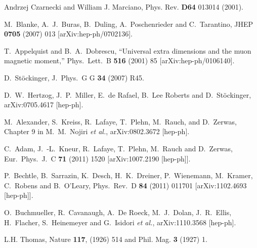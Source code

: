 \begin{thebibliography}{99}
  Andrzej Czarnecki and William J. Marciano,
Phys. Rev. {\bf D64} 013014 (2001).

  M.~Blanke, A.~J.~Buras, B.~Duling, A.~Poschenrieder and C.~Tarantino,
  JHEP {\bf 0705} (2007) 013
  [arXiv:hep-ph/0702136].

 T.~Appelquist and B.~A.~Dobrescu, ``Universal extra
dimensions and the muon magnetic moment,'' Phys.\ Lett.\ B
\textbf{516}
(2001) 85 [arXiv:hep-ph/0106140]. %

 D.\ St\"ockinger,
  J.\ Phys.\ G G {\bf 34} (2007) R45.

 D.~W.~Hertzog, J.~P.~Miller, E.~de Rafael, B.~Lee
Roberts and D.~St\"ockinger,
arXiv:0705.4617 [hep-ph]. %

 M.~Alexander, S.~Kreiss, R.~Lafaye, T.~Plehn,
M.~Rauch, and D.~Zerwas, Chapter 9 in M.~M.~Nojiri \textit{et al.},
arXiv:0802.3672 [hep-ph]. %

  C.~Adam, J.~-L.~Kneur, R.~Lafaye, T.~Plehn, M.~Rauch and D.~Zerwas,
  Eur.\ Phys.\ J.\ C {\bf 71} (2011) 1520
  [arXiv:1007.2190 [hep-ph]].

  P.~Bechtle, B.~Sarrazin, K.~Desch, H.~K.~Dreiner, P.~Wienemann, M.~Kramer, C.~Robens and B.~O'Leary,
  Phys.\ Rev.\ D {\bf 84} (2011) 011701
  [arXiv:1102.4693 [hep-ph]].

  O.~Buchmueller, R.~Cavanaugh, A.~De Roeck, M.~J.~Dolan, J.~R.~Ellis, H.~Flacher, S.~Heinemeyer and G.~Isidori {\it et al.},
  arXiv:1110.3568 [hep-ph].



 L.H. Thomas, Nature {\bf 117}, (1926) 514 and
Phil. Mag. {\bf 3} (1927) 1.


\end{thebibliography}
